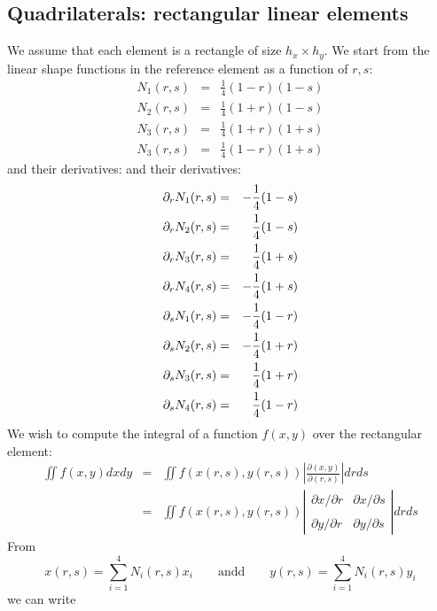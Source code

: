 \subsection{Quadrilaterals: rectangular linear elements}

We assume that each element is a rectangle of size $h_x \times h_y$. 
We start from the linear shape functions in the reference element as a function of $r,s$:
\begin{eqnarray}
N_1(r,s) &=& \frac{1}{4}(1-r)(1-s) \\ 
N_2(r,s) &=& \frac{1}{4}(1+r)(1-s) \\ 
N_3(r,s) &=& \frac{1}{4}(1+r)(1+s) \\ 
N_3(r,s) &=& \frac{1}{4}(1-r)(1+s) 
\end{eqnarray}
and their derivatives:
and their derivatives:
\begin{eqnarray}
\partial_r N_1(r,s) &=& -\frac{1}{4}(1-s) \nonumber\\
\partial_r N_2(r,s) &=& \frac{1}{4}(1-s) \nonumber\\
\partial_r N_3(r,s) &=& \frac{1}{4}(1+s) \nonumber\\
\partial_r N_4(r,s) &=& -\frac{1}{4}(1+s) \nonumber\\
\partial_s N_1(r,s) &=& -\frac{1}{4}(1-r) \nonumber\\
\partial_s N_2(r,s) &=& -\frac{1}{4}(1+r) \nonumber\\
\partial_s N_3(r,s) &=& \frac{1}{4}(1+r) \nonumber\\
\partial_s N_4(r,s) &=& \frac{1}{4}(1-r) \nonumber
\end{eqnarray}
We wish to compute the integral of a function $f(x,y)$ over the rectangular element:
\begin{eqnarray}
\iint f(x,y) dx dy 
&=& \iint f(x(r,s),y(r,s)) \left| \frac{\partial (x,y)}{\partial (r,s) } \right|  dr ds \\
&=& \iint f(x(r,s),y(r,s)) 
\left| 
\begin{array}{cc}
\partial x/\partial r & \partial x/\partial s \\ \\
\partial y/\partial r & \partial y/\partial s 
\end{array}
\right|  dr ds 
\end{eqnarray}
From 
\[
x(r,s)=\sum_{i=1}^4 N_i(r,s) x_i 
\qquad \text{andd} \qquad 
y(r,s)=\sum_{i=1}^4 N_i(r,s) y_i 
\]
we can write
